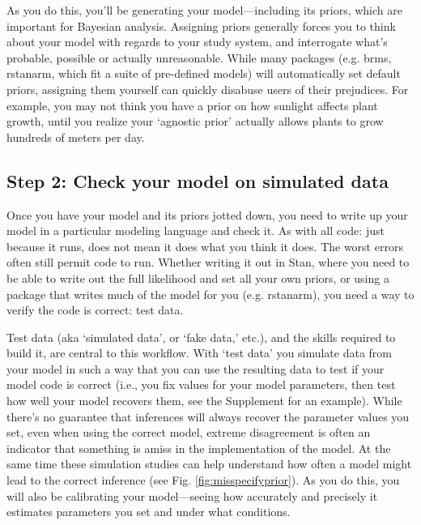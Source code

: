 \documentclass[11pt]{article}
\begin{document}
As you do this, you'll be generating your model---including its priors, which are important for Bayesian analysis. Assigning priors generally forces you to think about your model with regards to your study system, and interrogate what's probable, possible or actually unreasonable. While many packages (e.g. \textsf{brms, rstanarm}, which fit a suite of pre-defined models) will automatically set default priors, assigning them yourself can quickly disabuse users of their prejudices. For example, you may not think you have a prior on how sunlight affects plant growth, until you realize your `agnostic prior' actually allows plants to grow hundreds of meters per day. %

\subsection*{Step 2: Check your model on simulated data} 

Once you have your model and its priors jotted down, you need to write up your model in a particular modeling language and check it. As with all code: just because it runs, does not mean it does what you think it does. The worst errors often still permit code to run. Whether writing it out in \textsf{Stan}, where you need to be able to write out the full likelihood and set all your own priors, or using a package that writes much of the model for you (e.g. \textsf{rstanarm}), you need a way to verify the code is correct: test data.

Test data (aka `simulated data', or  `fake data,' etc.), and the skills required to build it, are central to this workflow. With `test data' you simulate data from your model in such a way that you can use the resulting data to test if your model code is correct (i.e., you fix values for your model parameters, then test how well your model recovers them, see the Supplement for an example). While there's no guarantee that inferences will always recover the parameter values you set, even when using the correct model, extreme disagreement is often an indicator that something is amiss in the implementation of the model. At the same time these simulation studies can help understand how often a model might lead to the correct inference (see Fig. \ref{fig:misspecifyprior}). As you do this, you will also be calibrating your model---seeing how accurately and precisely it estimates parameters you set and under what conditions. 
\end{document}
